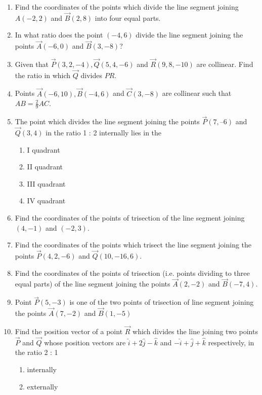 \begin{enumerate}[label=\thesubsection.\arabic*,ref=\thesubsection.\theenumi]
\begin{enumerate}
		\solution
	
\item Find the coordinates of the points which divide the line segment joining $A(-2,2)$  and  $\vec{B}(2,8)$ into four equal parts.
	\\
		\solution
	
\item In what ratio does the point $(-4,6)$ divide the line segment joining the points $\vec{A}(-6,0)$ and $\vec{B}(3,-8)$?
\item Given that $\vec{P}(3,2,-4), \vec{Q}(5,4,-6)$ and $\vec{R}(9,8,-10)$ are collinear. Find the ratio in which $\vec{Q}$ divides $PR$.
\item Points $\vec{A}(-6,10),\vec{B}(-4,6)$  and  $\vec{C}(3,-8)$ are collinear such that $AB=  \frac{2}{9}AC$.
\item The point which divides the line segment joining the points $\vec{P} (7, –6) $  and  $\vec{Q}(3, 4)$ in the 
ratio 1 : 2 internally lies in the
\begin{enumerate}
\item I quadrant
\item  II quadrant
\item  III quadrant
\item  IV quadrant
\end{enumerate}
\item Find the coordinates of the points of trisection of the line segment joining $(4,-1)$  and  $(-2,3)$.
	\\
		\solution
	
\item Find the coordinates of the points which trisect the line segment joining the points $\vec{P}(4,2,-6)$ and $\vec{Q}(10,-16,6)$.
\item Find the coordinates of the points of trisection (i.e. points dividing to three equal parts) of the line segment joining the points $\vec{A}(2,-2)$ and $\vec{B}(-7,4)$.
\item Point $\vec{P}(5,-3)$ is one of the two points of trisection of line segment joining the points $\vec{A}(7,-2)$ and $\vec{B}(1,-5)$
\item Find the position vector of a point $\vec{R}$ which divides the line joining two points $\vec{P}$
and $\vec{Q}$ whose position vectors are $\hat{i}+2\hat{j}-\hat{k}$ and $-\hat{i}+\hat{j}+\hat{k}$ respectively, in the
ratio 2 : 1
\begin{enumerate}
    \item  internally
    \item  externally

\end{enumerate}
\end{enumerate}
\end{enumerate}
